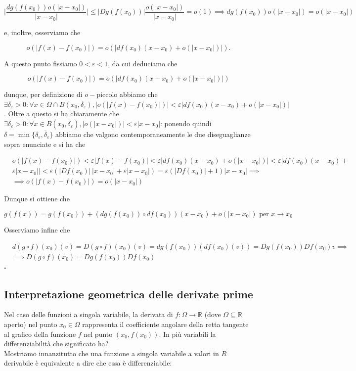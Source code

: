 $$\Bigg| \frac{dg(f(x_0))o(|x-x_0|)}{|x-x_0|} \Bigg| \leq |Dg(f(x_0))| \frac{o(|x-x_0|)}{|x-x_0|} = o(1) \implies dg(f(x_0))o(|x-x_0|) = o(|x-x_0|)$$

e, inoltre, osserviamo che

$$o(|f(x)-f(x_0)|) = o(|df(x_0)(x-x_0) + o(|x-x_0|)|).$$

A questo punto fissiamo $0 < \varepsilon < 1$, da cui deduciamo che

$$o(|f(x)-f(x_0)|) = o(|df(x_0)(x-x_0) + o(|x-x_0|)|)$$

dunque, per definizione di $o-$piccolo abbiamo che $\exists \delta_\varepsilon > 0: \forall x \in \Omega \cap B(x_0, \delta_\varepsilon), |o(|f(x)-f(x_0)|)| < \varepsilon |df(x_0)(x-x_0) + o(|x-x_0|)|$. Oltre a questo si ha chiaramente che $\exists \bar{\delta}_\varepsilon > 0: \forall x \in B(x_0, \bar{\delta}_\varepsilon), |o(|x-x_0|)| < \varepsilon |x-x_0|$: ponendo quindi $\delta = \min \{\delta_\varepsilon, \bar{\delta}_ \varepsilon \}$ abbiamo che valgono contemporaneamente le due diseguaglianze sopra enunciate e si ha che

\[\begin{aligned}
&o(|f(x)-f(x_0)|) < \varepsilon |f(x)-f(x_0)| < \varepsilon|df(x_0)(x-x_0) + o(|x-x_0|)| < \varepsilon |df(x_0)(x-x_0) + \\
& \varepsilon|x-x_0|| <\varepsilon (|Df(x_0)| \, |x-x_0| + \varepsilon |x-x_0|) = \varepsilon (|Df(x_0)| + 1)|x-x_0| \implies \\
&\implies o(|f(x)-f(x_0)|) = o(|x-x_0|)
\end{aligned}\]

Dunque si ottiene che

$$g(f(x)) = g(f(x_0)) + (dg(f(x_0)) \circ df(x_0))(x-x_0)+ o(|x-x_0|) \text{ per } x \to x_0$$

Osserviamo infine che

\[\begin{aligned}
&d(g \circ f)(x_0)(v) = D(g \circ f)(x_0)(v) = dg(f(x_0))(df(x_0)(v)) = Dg(f(x_0))Df(x_0)v \implies \\
&\implies D(g \circ f)(x_0) = Dg(f(x_0))Df(x_0)
\end{aligned}\]
\hfill $\square$

\vspace{0.5cm}
\subsection{Interpretazione geometrica delle derivate prime}
Nel caso delle funzioni a singola variabile, la derivata di $f: \Omega \to \mathbb{R}$ (dove $\Omega \subseteq \mathbb{R}$ aperto) nel punto $x_0 \in \Omega$ rappresenta il coefficiente angolare della retta tangente al grafico della funzione $f$ nel punto $(x_0, f(x_0))$. In più variabili la differenziabilità che significato ha? \\
Mostriamo innanzitutto che una funzione a singola variabile a valori in $R$ derivabile è equivalente a dire che essa è differenziabile:

